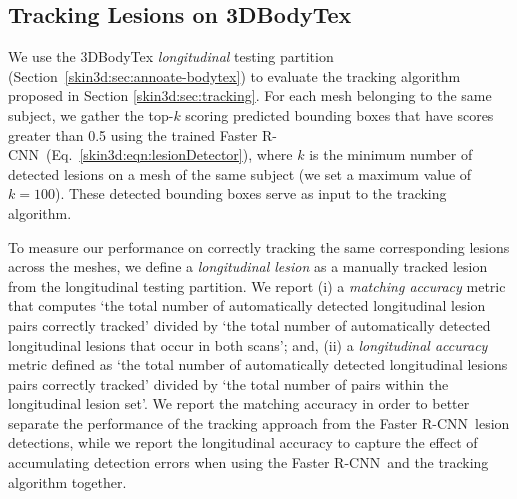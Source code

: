 \documentclass[journal]{IEEEtran}
\def\fasterrcnn{Faster R-CNN}
\begin{document}
\subsection{Tracking Lesions on 3DBodyTex}
\label{skin3d:sec:3dbodytex-tracking}

We use the 3DBodyTex \emph{longitudinal} testing partition (Section~\ref{skin3d:sec:annoate-bodytex}) to evaluate the tracking algorithm proposed in Section \ref{skin3d:sec:tracking}. For each mesh belonging to the same subject, we gather the top-$k$ scoring predicted bounding boxes that have scores greater than 0.5 using the trained \fasterrcnn~(Eq.~\ref{skin3d:eqn:lesionDetector}), where $k$ is the minimum number of detected lesions on a mesh of the same subject (we set a maximum value of $k=100$). These detected bounding boxes serve as input to the tracking algorithm.

To measure our performance on correctly tracking the same corresponding lesions across the meshes, we define a \emph{longitudinal lesion} as a manually tracked lesion from the longitudinal testing partition. We report (i) a \emph{matching accuracy} metric that computes `the total number of automatically detected longitudinal lesion pairs correctly tracked' divided by `the total number of automatically detected longitudinal lesions that occur in both scans'; and, (ii) a \emph{longitudinal accuracy} metric defined as `the total number of automatically detected longitudinal lesions pairs correctly tracked' divided by `the total number of pairs within the longitudinal lesion set'. We report the matching accuracy in order to better separate the performance of the tracking approach from the \fasterrcnn~lesion detections, while we report the longitudinal accuracy to capture the effect of accumulating detection errors when using the \fasterrcnn~and  the tracking algorithm together.
\end{document}
